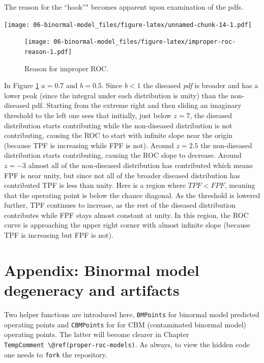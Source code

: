 \documentclass[
]{book}
\begin{document}
The reason for the ``hook''" becomes apparent upon examination of the pdfs.

\texttt{[image: 06-binormal-model\_files/figure-latex/unnamed-chunk-14-1.pdf]}

\begin{figure}
\centering
\texttt{[image: 06-binormal-model\_files/figure-latex/improper-roc-reason-1.pdf]}
\caption{\label{fig:improper-roc-reason}Reason for improper ROC.}
\end{figure}

In Figure \ref{fig:improper-roc-reason} \(a = 0.7\) and \(b = 0.5\). Since \(b < 1\) the diseased \emph{pdf} is broader and has a lower peak (since the integral under each distribution is unity) than the non-diseased pdf. Starting from the extreme right and then sliding an imaginary threshold to the left one sees that initially, just below \(z = 7\), the diseased distribution starts contributing while the non-diseased distribution is not contributing, causing the ROC to start with infinite slope near the origin (because TPF is increasing while FPF is not). Around \(z = 2.5\) the non-diseased distribution starts contributing, causing the ROC slope to decrease. Around \(z = -3\) almost all of the non-diseased distribution has contributed which means FPF is near unity, but since not all of the broader diseased distribution has contributed TPF is less than unity. Here is a region where \(TPF < FPF\), meaning that the operating point is below the chance diagonal. As the threshold is lowered further, TPF continues to increase, as the rest of the diseased distribution contributes while FPF stays almost constant at unity. In this region, the ROC curve is approaching the upper right corner with almost infinite slope (because TPF is increasing but FPF is not).

\hypertarget{binormal-model-degeneracy-artifacts}{%
\section{Appendix: Binormal model degeneracy and artifacts}\label{binormal-model-degeneracy-artifacts}}

Two helper functions are introduced here, \texttt{BMPoints} for binormal model predicted operating points and \texttt{CBMPoints} for for CBM (contaminated binormal model) operating points. The latter will become clearer in Chapter \texttt{TempComment\ \textbackslash{}@ref(proper-roc-models)}. As always, to view the hidden code one needs to \texttt{fork} the repository.
\end{document}
